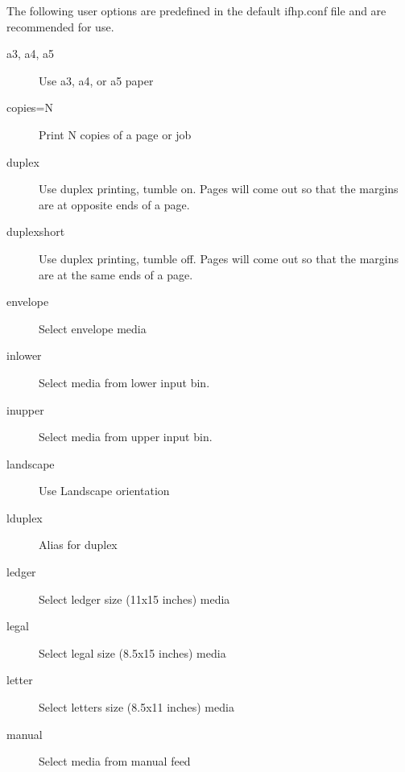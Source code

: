 \documentclass[a4paper]{article}
\begin{document}
The following user options are predefined in the default
{\ttfamily ifhp.conf} file and are recommended for use.
\begin{description}
\item[a3, a4, a5 ] \mbox{}

Use a3, a4, or a5 paper

\item[copies=N] \mbox{}

Print N copies of a page or job

\item[duplex] \mbox{}

Use duplex printing,  tumble on.
Pages will come out so that the margins are at opposite ends
of a page.

\item[duplexshort] \mbox{}

Use duplex printing,  tumble off.
Pages will come out so that the margins are at the same
ends of a page.

\item[envelope] \mbox{}

Select envelope media

\item[inlower] \mbox{}

Select media from lower input bin.

\item[inupper] \mbox{}

Select media from upper input bin.

\item[landscape] \mbox{}

Use Landscape orientation

\item[lduplex] \mbox{}

Alias for duplex

\item[ledger] \mbox{}

Select ledger size (11x15 inches) media

\item[legal] \mbox{}

Select legal size (8.5x15 inches) media

\item[letter] \mbox{}

Select letters size (8.5x11 inches) media

\item[manual] \mbox{}

Select media from manual feed


\end{description}
\end{document}
